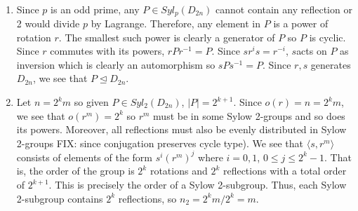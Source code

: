 \documentclass[12pt]{article}
\begin{document}
\begin{problem}[6]
~\begin{enumerate}[label=(\alph*)]
	\item Since $ p$ is an odd prime, any  $ P \in Syl_{ p}( D_{2n}) $ cannot contain any reflection or 2 would divide $ p$ by Lagrange. Therefore, any element in  $ P$ is a power of rotation  $ r$. The smallest such power is clearly a generator of  $ P$ so  $ P$ is cyclic. Since $ r$ commutes with its powers, $ rPr^{-1} = P$. Since $ sr^{i}s = r^{-i}$, $ s$acts on  $ P$ as inversion which is clearly an automorphism so  $ sPs ^{-1} =P$. Since $ r,s$ generates  $ D_{2n}$, we see that $ P \trianglelefteq D_{2n}$.
	\item Let $ n = 2^{k}m$ so given $ P \in Syl_{ 2}( D_{2n}) $, $ |P| = 2^{k+1}$. Since $ o(r) = n = 2^{k}m$, we see that $ o(r^{m})= 2^{k}$ so $ r^{m}$ must be in some Sylow 2-groups and so does its powers. Moreover, all reflections must also be evenly distributed in Sylow 2-groups FIX: since conjugation preserves cycle type). We see that $ \langle s,r^{m} \rangle$ consists of elements of the form $ s^{i}(r^{m})^{j}$ where $ i=0,1$,  $0 \leq j \leq 2^{k} -1$. That is, the order of the group is $ 2^{k}$ rotations and $ 2^{k}$ reflections with a total order of $ 2^{k+1}$. This is precisely the order of a Sylow 2-subgroup. Thus, each Sylow 2-subgroup contains $ 2^{k}$ reflections, so $ n_2 = 2^{k}m / 2^{k} = m$.
\end{enumerate}
\end{problem}
\end{document}
